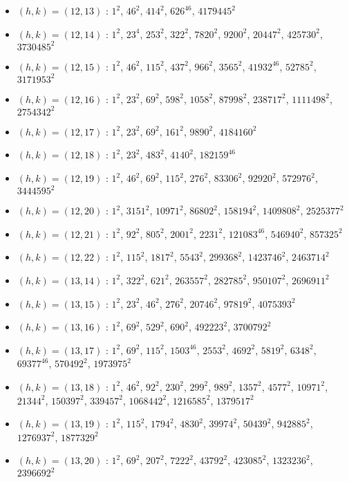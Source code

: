 \begin{itemize}
\item $(h,k)=(12,13)$ : $1^{2}$, $46^{2}$, $414^{2}$, $626^{46}$, $4179445^{2}$
\item $(h,k)=(12,14)$ : $1^{2}$, $23^{4}$, $253^{2}$, $322^{2}$, $7820^{2}$, $9200^{2}$, $20447^{2}$, $425730^{2}$, $3730485^{2}$
\item $(h,k)=(12,15)$ : $1^{2}$, $46^{2}$, $115^{2}$, $437^{2}$, $966^{2}$, $3565^{2}$, $41932^{46}$, $52785^{2}$, $3171953^{2}$
\item $(h,k)=(12,16)$ : $1^{2}$, $23^{2}$, $69^{2}$, $598^{2}$, $1058^{2}$, $87998^{2}$, $238717^{2}$, $1111498^{2}$, $2754342^{2}$
\item $(h,k)=(12,17)$ : $1^{2}$, $23^{2}$, $69^{2}$, $161^{2}$, $9890^{2}$, $4184160^{2}$
\item $(h,k)=(12,18)$ : $1^{2}$, $23^{2}$, $483^{2}$, $4140^{2}$, $182159^{46}$
\item $(h,k)=(12,19)$ : $1^{2}$, $46^{2}$, $69^{2}$, $115^{2}$, $276^{2}$, $83306^{2}$, $92920^{2}$, $572976^{2}$, $3444595^{2}$
\item $(h,k)=(12,20)$ : $1^{2}$, $3151^{2}$, $10971^{2}$, $86802^{2}$, $158194^{2}$, $1409808^{2}$, $2525377^{2}$
\item $(h,k)=(12,21)$ : $1^{2}$, $92^{2}$, $805^{2}$, $2001^{2}$, $2231^{2}$, $121083^{46}$, $546940^{2}$, $857325^{2}$
\item $(h,k)=(12,22)$ : $1^{2}$, $115^{2}$, $1817^{2}$, $5543^{2}$, $299368^{2}$, $1423746^{2}$, $2463714^{2}$
\item $(h,k)=(13,14)$ : $1^{2}$, $322^{2}$, $621^{2}$, $263557^{2}$, $282785^{2}$, $950107^{2}$, $2696911^{2}$
\item $(h,k)=(13,15)$ : $1^{2}$, $23^{2}$, $46^{2}$, $276^{2}$, $20746^{2}$, $97819^{2}$, $4075393^{2}$
\item $(h,k)=(13,16)$ : $1^{2}$, $69^{2}$, $529^{2}$, $690^{2}$, $492223^{2}$, $3700792^{2}$
\item $(h,k)=(13,17)$ : $1^{2}$, $69^{2}$, $115^{2}$, $1503^{46}$, $2553^{2}$, $4692^{2}$, $5819^{2}$, $6348^{2}$, $69377^{46}$, $570492^{2}$, $1973975^{2}$
\item $(h,k)=(13,18)$ : $1^{2}$, $46^{2}$, $92^{2}$, $230^{2}$, $299^{2}$, $989^{2}$, $1357^{2}$, $4577^{2}$, $10971^{2}$, $21344^{2}$, $150397^{2}$, $339457^{2}$, $1068442^{2}$, $1216585^{2}$, $1379517^{2}$
\item $(h,k)=(13,19)$ : $1^{2}$, $115^{2}$, $1794^{2}$, $4830^{2}$, $39974^{2}$, $50439^{2}$, $942885^{2}$, $1276937^{2}$, $1877329^{2}$
\item $(h,k)=(13,20)$ : $1^{2}$, $69^{2}$, $207^{2}$, $7222^{2}$, $43792^{2}$, $423085^{2}$, $1323236^{2}$, $2396692^{2}$

\end{itemize}
